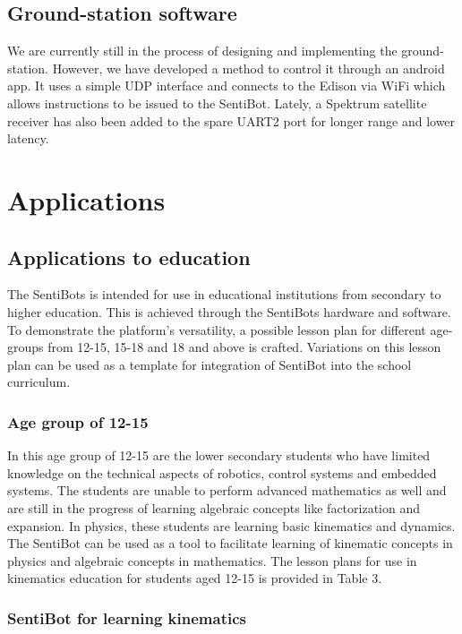 \documentclass[12pt]{article}
\begin{document}
\subsection{Ground-station software}

We are currently still in the process of designing and implementing the ground-station. However, we have developed a method to control it through an android app. It uses a simple UDP interface and connects to the Edison via WiFi which allows instructions to be issued to the SentiBot. Lately, a Spektrum satellite receiver has also been added to the spare UART2 port for longer range and lower latency.

\section{Applications}

\subsection{Applications to education}

The SentiBots is intended for use in educational institutions from secondary to higher education. This is achieved through the SentiBots hardware and software. To demonstrate the platform’s versatility, a possible lesson plan for different age-groups from 12-15, 15-18 and 18 and above is crafted. Variations on this lesson plan can be used as a template for integration of SentiBot into the school curriculum.

\subsubsection{Age group of 12-15}

In this age group of 12-15 are the lower secondary students who have limited knowledge on the technical aspects of robotics, control systems and embedded systems. The students are unable to perform advanced mathematics as well and are still in the progress of learning algebraic concepts like factorization and expansion. In physics, these students are learning basic kinematics and dynamics. The SentiBot can be used as a tool to facilitate learning of kinematic concepts in physics and algebraic concepts in mathematics. The lesson plans for use in kinematics education for students aged 12-15 is provided in Table 3.

\subsubsection{SentiBot for learning kinematics}
\end{document}
